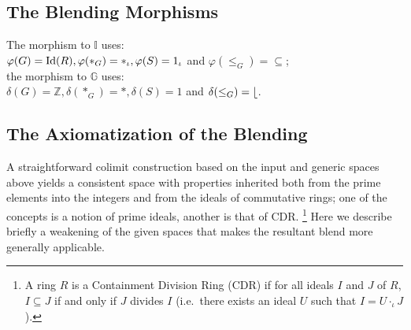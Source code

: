 \subsection{The Blending Morphisms}

The morphism to $\mathbb{I}$  uses:\\
$\varphi(G)={\rm Id}(R),\varphi(*_G)=*_{\iota},
\varphi(S)=1_{\iota}$ and $\varphi(\leq_G)=\subseteq$;\\
the morphism to $\mathbb{G}$ uses:\\ $\delta(G)=\mathbb{Z}, \delta(*_G)=*,
\delta(S)=1$ and $\delta(\leq_G)= \lfloor$.


\subsection{The Axiomatization of the Blending}

A straightforward colimit construction based on the input and generic
spaces above yields a consistent space with properties inherited both
from the prime elements into the integers and from the ideals of
commutative rings; one of the concepts is a notion of prime ideals,
another is that of CDR.%
\footnote{A ring $R$ is a Containment Division Ring (CDR) if for all
  ideals $I$ and $J$ of $R$, $I \subseteq J$ if and only if $J$
  divides $I$ (i.e.\ there exists an ideal $U$ such that
  $I=U\cdot_{\iota}J$).}  
Here we describe briefly a weakening of the
given spaces that makes the resultant blend more generally applicable.

%
%
 
